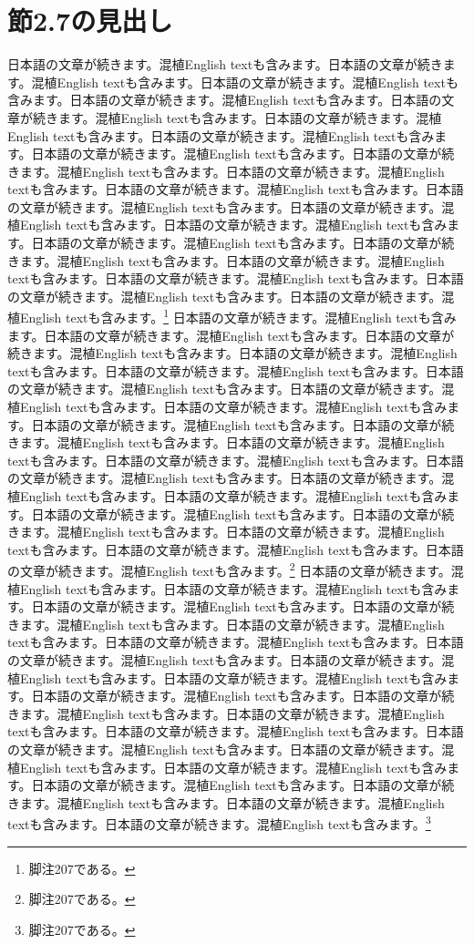 \documentclass[pdflatex,book]{jlreq}
\begin{document}
\section{節2.7の見出し}
日本語の文章が続きます。混植English textも含みます。日本語の文章が続きます。混植English textも含みます。日本語の文章が続きます。混植English textも含みます。日本語の文章が続きます。混植English textも含みます。日本語の文章が続きます。混植English textも含みます。日本語の文章が続きます。混植English textも含みます。日本語の文章が続きます。混植English textも含みます。日本語の文章が続きます。混植English textも含みます。日本語の文章が続きます。混植English textも含みます。日本語の文章が続きます。混植English textも含みます。日本語の文章が続きます。混植English textも含みます。日本語の文章が続きます。混植English textも含みます。日本語の文章が続きます。混植English textも含みます。日本語の文章が続きます。混植English textも含みます。日本語の文章が続きます。混植English textも含みます。日本語の文章が続きます。混植English textも含みます。日本語の文章が続きます。混植English textも含みます。日本語の文章が続きます。混植English textも含みます。日本語の文章が続きます。混植English textも含みます。日本語の文章が続きます。混植English textも含みます。\footnote{脚注207である。}
日本語の文章が続きます。混植English textも含みます。日本語の文章が続きます。混植English textも含みます。日本語の文章が続きます。混植English textも含みます。日本語の文章が続きます。混植English textも含みます。日本語の文章が続きます。混植English textも含みます。日本語の文章が続きます。混植English textも含みます。日本語の文章が続きます。混植English textも含みます。日本語の文章が続きます。混植English textも含みます。日本語の文章が続きます。混植English textも含みます。日本語の文章が続きます。混植English textも含みます。日本語の文章が続きます。混植English textも含みます。日本語の文章が続きます。混植English textも含みます。日本語の文章が続きます。混植English textも含みます。日本語の文章が続きます。混植English textも含みます。日本語の文章が続きます。混植English textも含みます。日本語の文章が続きます。混植English textも含みます。日本語の文章が続きます。混植English textも含みます。日本語の文章が続きます。混植English textも含みます。日本語の文章が続きます。混植English textも含みます。日本語の文章が続きます。混植English textも含みます。\footnote{脚注207である。}
日本語の文章が続きます。混植English textも含みます。日本語の文章が続きます。混植English textも含みます。日本語の文章が続きます。混植English textも含みます。日本語の文章が続きます。混植English textも含みます。日本語の文章が続きます。混植English textも含みます。日本語の文章が続きます。混植English textも含みます。日本語の文章が続きます。混植English textも含みます。日本語の文章が続きます。混植English textも含みます。日本語の文章が続きます。混植English textも含みます。日本語の文章が続きます。混植English textも含みます。日本語の文章が続きます。混植English textも含みます。日本語の文章が続きます。混植English textも含みます。日本語の文章が続きます。混植English textも含みます。日本語の文章が続きます。混植English textも含みます。日本語の文章が続きます。混植English textも含みます。日本語の文章が続きます。混植English textも含みます。日本語の文章が続きます。混植English textも含みます。日本語の文章が続きます。混植English textも含みます。日本語の文章が続きます。混植English textも含みます。日本語の文章が続きます。混植English textも含みます。\footnote{脚注207である。}
\end{document}
